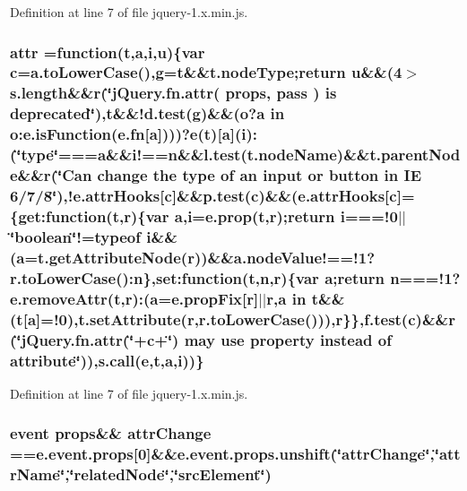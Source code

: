 Definition at line 7 of file jquery-\/1.\+x.\+min.\+js.

\subsubsection[{\texorpdfstring{attr}{attr}}]{ attr =function({\bf t},{\bf a},{\bf i},{\bf u})\{var {\bf c}=a.\+to\+Lower\+Case(),{\bf g}={\bf t}\&\&t.\+node\+Type;return {\bf u}\&\&(4$>${\bf s.\+length}\&\&r(\char`\"{}j\+Query.\+fn.\+attr( props, pass ) is deprecated\char`\"{}),t\&\&!d.\+test({\bf g})\&\&({\bf o}?{\bf a} in o\+:e.\+is\+Function({\bf e.\+fn}\mbox{[}{\bf a}\mbox{]})))?{\bf e}({\bf t})\mbox{[}{\bf a}\mbox{]}({\bf i})\+:(\char`\"{}type\char`\"{}===a\&\&i!=={\bf n}\&\&l.\+test(t.\+node\+Name)\&\&t.\+parent\+Node\&\&r(\char`\"{}Can change the \textquotesingle{}type\textquotesingle{} of {\bf an} input or button in IE 6/7/8\char`\"{}),!e.\+attr\+Hooks\mbox{[}{\bf c}\mbox{]}\&\&p.\+test({\bf c})\&\&(e.\+attr\+Hooks\mbox{[}{\bf c}\mbox{]}=\{get\+:function({\bf t},r)\{var {\bf a},{\bf i}=e.\+prop({\bf t},r);return {\bf i}===!0$\vert$$\vert$\char`\"{}boolean\char`\"{}!=typeof {\bf i}\&\&({\bf a}=t.\+get\+Attribute\+Node(r))\&\&a.\+node\+Value!==!1?r.\+to\+Lower\+Case()\+:{\bf n}\},set\+:function({\bf t},{\bf n},r)\{var {\bf a};return {\bf n}===!1?e.\+remove\+Attr({\bf t},r)\+:({\bf a}=e.\+prop\+Fix\mbox{[}r\mbox{]}$\vert$$\vert$r,{\bf a} in {\bf t}\&\&({\bf t}\mbox{[}{\bf a}\mbox{]}=!0),t.\+set\+Attribute(r,r.\+to\+Lower\+Case())),r\}\},f.\+test({\bf c})\&\&r(\char`\"{}j\+Query.\+fn.\+attr(\textquotesingle{}\char`\"{}+c+\char`\"{}\textquotesingle{}) may use property instead of attribute\char`\"{})),s.\+call({\bf e},{\bf t},{\bf a},{\bf i}))\}}\hypertarget{jquery-1_8x_8min_8js_a571977117149de472ef2f4cd0087bc92}{}\label{jquery-1_8x_8min_8js_a571977117149de472ef2f4cd0087bc92}


Definition at line 7 of file jquery-\/1.\+x.\+min.\+js.

\subsubsection[{\texorpdfstring{attr\+Change}{attrChange}}]{ event props\&\& attr\+Change ==e.\+event.\+props\mbox{[}0\mbox{]}\&\&e.\+event.\+props.\+unshift(\char`\"{}attr\+Change\char`\"{},\char`\"{}attr\+Name\char`\"{},\char`\"{}related\+Node\char`\"{},\char`\"{}src\+Element\char`\"{})}\hypertarget{jquery-1_8x_8min_8js_a68b4be885a1e4895f79417999469377d}{}\label{jquery-1_8x_8min_8js_a68b4be885a1e4895f79417999469377d}


